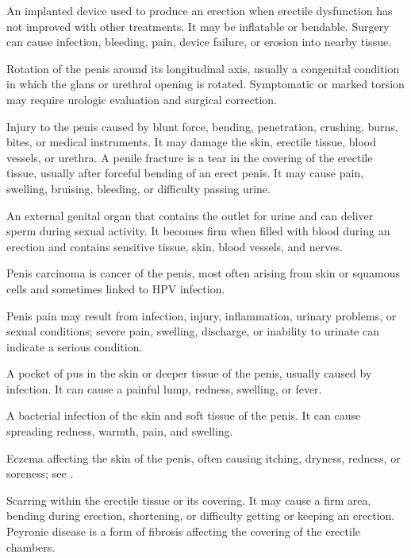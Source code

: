  An implanted device used to produce an erection when erectile dysfunction has not improved with other treatments. It may be inflatable or bendable. Surgery can cause infection, bleeding, pain, device failure, or erosion into nearby tissue.

 Rotation of the penis around its longitudinal axis, usually a congenital condition in which the glans or urethral opening is rotated. Symptomatic or marked torsion may require urologic evaluation and surgical correction.

 Injury to the penis caused by blunt force, bending, penetration, crushing, burns, bites, or medical instruments. It may damage the skin, erectile tissue, blood vessels, or urethra. A penile fracture is a tear in the covering of the erectile tissue, usually after forceful bending of an erect penis. It may cause pain, swelling, bruising, bleeding, or difficulty passing urine.

 An external genital organ that contains the outlet for urine and can deliver sperm during sexual activity. It becomes firm when filled with blood during an erection and contains sensitive tissue, skin, blood vessels, and nerves.

 Penis carcinoma is cancer of the penis, most often arising from skin or squamous cells and sometimes linked to HPV infection.

 Penis pain may result from infection, injury, inflammation, urinary problems, or sexual conditions; severe pain, swelling, discharge, or inability to urinate can indicate a serious condition.

 A pocket of pus in the skin or deeper tissue of the penis, usually caused by infection. It can cause a painful lump, redness, swelling, or fever.

 A bacterial infection of the skin and soft tissue of the penis. It can cause spreading redness, warmth, pain, and swelling.

 Eczema affecting the skin of the penis, often causing itching, dryness, redness, or soreness; see .

 Scarring within the erectile tissue or its covering. It may cause a firm area, bending during erection, shortening, or difficulty getting or keeping an erection. Peyronie disease is a form of fibrosis affecting the covering of the erectile chambers.

